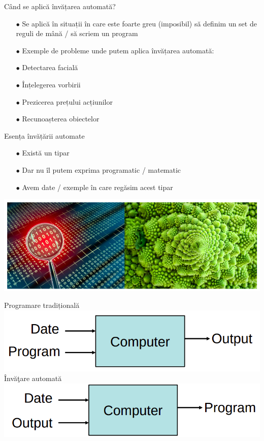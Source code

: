 \documentclass{beamer}
\begin{document}
\begin{frame}{Când se aplică învățarea automată?}
\begin{itemize}
	\item[$\bullet$] Se aplică în situații în care este foarte greu (imposibil) să definim un set de reguli de mână / să scriem un program
	\item[$\bullet$] Exemple de probleme unde putem aplica învățarea automată:
	\item[$\bullet$] Detectarea facială
	\item[$\bullet$] Înțelegerea vorbirii
	\item[$\bullet$] Prezicerea prețului acțiunilor
	\item[$\bullet$] Recunoașterea obiectelor
\end{itemize}
\end{frame}

\begin{frame}{Esența învățării automate}
\begin{itemize}
	\item[$\bullet$] Există un tipar
	\item[$\bullet$] Dar nu îl putem exprima programatic / matematic
	\item[$\bullet$] Avem date / exemple în care regăsim acest tipar
\end{itemize}
    \begin{center}
	\includegraphics[scale=.35]{pic4.png}
     \end{center}
\end{frame}

\begin{frame}{}
\begin{center}
	{\huge Programare tradițională}
	\\[.5cm]
	\includegraphics[scale=.35]{pic5.png}
	\\[.5cm]
	{\huge Învăţare automată}
	\\[.5cm]
	\includegraphics[scale=.35]{pic6.png}
\end{center}
\end{frame}
\end{document}
